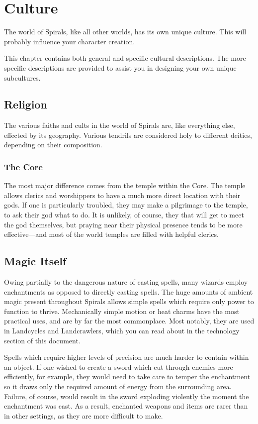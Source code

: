 \chapter{Culture}
The world of Spirals, like all other worlds, has its own unique culture.
This will probably influence your character creation.

This chapter contains both general and specific cultural descriptions.
The more specific descriptions are provided to assist you in designing your own unique subcultures.

\begin{multicols}{2}
\section{Religion}
The various faiths and cults in the world of Spirals are, like everything else, effected by its geography.
Various tendrils are considered holy to different deities, depending on their composition.

\subsection{The Core}
The most major difference comes from the temple within the Core. 
The temple allows clerics and worshippers to have a much more direct location with their gods.
If one is particularly troubled, they may make a pilgrimage to the temple, to ask their god what to do.
It is unlikely, of course, they that will get to meet the god themselves, but praying near their physical presence tends to be more effective---and most of the world temples are filled with helpful clerics.

\section{Magic Itself}
Owing partially to the dangerous nature of casting spells, many wizards employ enchantments as opposed to directly casting spells.
The huge amounts of ambient magic present throughout Spirals allows simple spells which require only power to function to thrive.
Mechanically simple motion or heat charms have the most practical uses, and are by far the most commonplace.
Most notably, they are used in Landcycles and Landcrawlers, which you can read about in the technology section of this document.

Spells which require higher levels of precision are much harder to contain within an object.
If one wished to create a sword which cut through enemies more efficiently, for example, they would need to take care to temper the enchantment so it draws only the required amount of energy from the surrounding area.
Failure, of course, would result in the sword exploding violently the moment the enchantment was cast.
As a result, enchanted weapons and items are rarer than in other settings, as they are more difficult to make.


\end{multicols}
